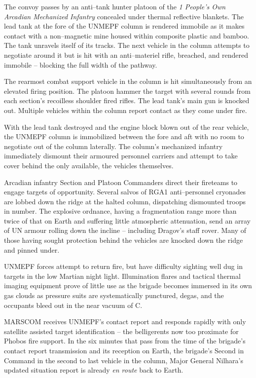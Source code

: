 The convoy passes by an anti--tank hunter platoon of the {\it 1 People's Own Arcadian Mechanized Infantry} concealed under thermal reflective blankets. The lead tank at the fore of the UNMEPF column is rendered immobile as it makes contact with a non--magnetic mine housed within composite plastic and bamboo. The tank unravels itself of its tracks. The next vehicle in the column attempts to negotiate around it but is hit with an anti--materiel rifle, breached, and rendered immobile -- blocking the full width of the pathway.

The rearmost combat support vehicle in the column is hit simultaneously from an elevated firing position. The platoon hammer the target with several rounds from each section's recoilless shoulder fired rifles. The lead tank's main gun is knocked out. Multiple vehicles within the column report contact as they come under fire.

With the lead tank destroyed and the engine block blown out of the rear vehicle, the UNMEPF column is immobilized between the fore and aft with no room to negotiate out of the column laterally. The column's mechanized infantry immediately dismount their armoured personnel carriers and attempt to take cover behind the only available, the vehicles themselves. 

Arcadian infantry Section and Platoon Commanders direct their fireteams to engage targets of opportunity. Several salvos of RGA1 anti--personnel cryonades are lobbed down the ridge at the halted column, dispatching dismounted troops in number. The explosive ordnance, having a fragmentation range more than twice of that on Earth and suffering little atmospheric attenuation, send an array of UN armour rolling down the incline -- including Dragov's staff rover. Many of those having sought protection behind the vehicles are knocked down the ridge and pinned under.

UNMEPF forces attempt to return fire, but have difficulty sighting well dug in targets in the low Martian night light. Illumination flares and tactical thermal imaging equipment prove of little use as the brigade becomes immersed in its own gas clouds as pressure suits are systematically punctured, degas, and the occupants bleed out in the near vacuum of C.

MARSCOM receives UNMEPF's contact report and responds rapidly with only satellite assisted target identification -- the belligerents now too proximate for Phobos fire support. In the six minutes that pass from the time of the brigade's contact report transmission and its reception on Earth, the brigade's Second in Command in the second to last vehicle in the column, Major General Nilhara's updated situation report is already {\it en route} back to Earth.

